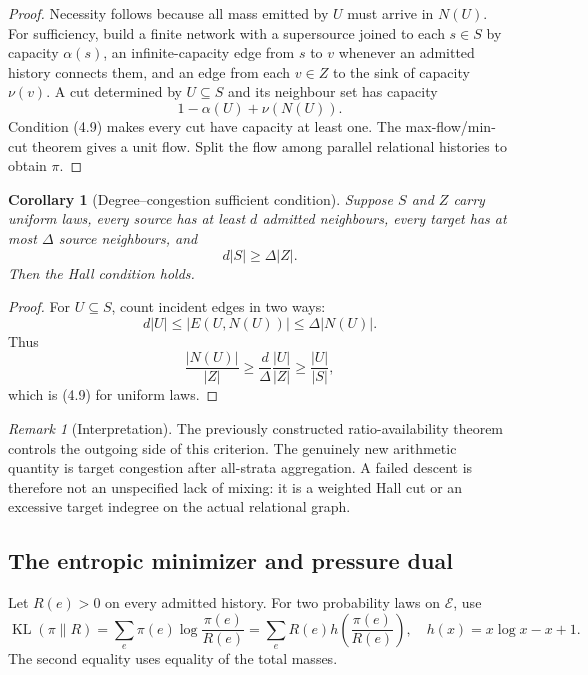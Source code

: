 \documentclass[11pt]{article}
\newtheorem{corollary}[theorem]{Corollary}
\theoremstyle{definition}
\theoremstyle{remark}
\newtheorem{remark}[theorem]{Remark}
\newcommand{\KL}{\operatorname{KL}}
\begin{document}
\begin{proof}
Necessity follows because all mass emitted by $U$ must arrive in $N(U)$.
For sufficiency, build a finite network with a supersource joined to each
$s\in S$ by capacity $\alpha(s)$, an infinite-capacity edge from $s$ to $v$
whenever an admitted history connects them, and an edge from each $v\in Z$ to
the sink of capacity $\nu(v)$.  A cut determined by $U\subseteq S$ and its
neighbour set has capacity
\[
 1-\alpha(U)+\nu(N(U)).
\]
Condition \textup{(4.9)} makes every cut have capacity at least one.  The
max-flow/min-cut theorem gives a unit flow.  Split the flow among parallel
relational histories to obtain $\pi$.
\end{proof}

\begin{corollary}[Degree--congestion sufficient condition]
\label{cor:degree-Hall}
Suppose $S$ and $Z$ carry uniform laws, every source has at least $d$ admitted
neighbours, every target has at most $\Delta$ source neighbours, and
\[
 \boxed{d|S|\ge\Delta|Z|.}
 \tag{4.10}
\]
Then the Hall condition holds.
\end{corollary}

\begin{proof}
For $U\subseteq S$, count incident edges in two ways:
\[
 d|U|\le |E(U,N(U))|\le\Delta|N(U)|.
\]
Thus
\[
 \frac{|N(U)|}{|Z|}
 \ge\frac d\Delta\frac{|U|}{|Z|}
 \ge\frac{|U|}{|S|},
\]
which is \textup{(4.9)} for uniform laws.
\end{proof}

\begin{remark}[Interpretation]
The previously constructed ratio-availability theorem controls the outgoing side of this
criterion.  The genuinely new arithmetic quantity is target congestion after
all-strata aggregation.  A failed descent is therefore not an unspecified
lack of mixing: it is a weighted Hall cut or an excessive target indegree on
the actual relational graph.
\end{remark}

\subsection{The entropic minimizer and pressure dual}

Let $R(e)>0$ on every admitted history.  For two probability laws on
$\mathcal E$, use
\[
 \KL(\pi\|R)
 =\sum_e\pi(e)\log\frac{\pi(e)}{R(e)}
 =\sum_eR(e)h\!\left(\frac{\pi(e)}{R(e)}\right),
 \quad
 h(x)=x\log x-x+1.
 \tag{4.11}
\]
The second equality uses equality of the total masses.
\end{document}
